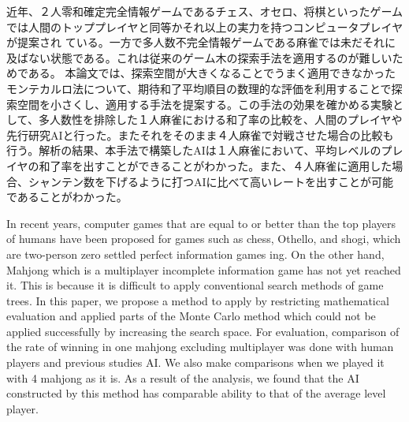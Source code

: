 
\begin{jabstract}

近年、２人零和確定完全情報ゲームであるチェス、オセロ、将棋といったゲームでは人間のトッププレイヤと同等かそれ以上の実力を持つコンピュータプレイヤが提案され
ている。一方で多人数不完全情報ゲームである麻雀では未だそれに及ばない状態である。これは従来のゲーム木の探索手法を適用するのが難しいためである。
本論文では、探索空間が大きくなることでうまく適用できなかったモンテカルロ法について、期待和了平均順目の数理的な評価を利用することで探索空間を小さくし、適用する手法を提案する。この手法の効果を確かめる実験として、多人数性を排除した１人麻雀における和了率の比較を、人間のプレイヤや先行研究AIと行った。またそれをそのまま４人麻雀で対戦させた場合の比較も行う。解析の結果、本手法で構築したAIは１人麻雀において、平均レベルのプレイヤの和了率を出すことができることがわかった。また、４人麻雀に適用した場合、シャンテン数を下げるように打つAIに比べて高いレートを出すことが可能であることがわかった。


\end{jabstract}


\begin{eabstract}

In recent years, computer games that are equal to or better than the top players of humans have been proposed for games such as chess, Othello, and shogi, which are two-person zero settled perfect information games
ing. On the other hand, Mahjong which is a multiplayer incomplete information game has not yet reached it. This is because it is difficult to apply conventional search methods of game trees.
In this paper, we propose a method to apply by restricting mathematical evaluation and applied parts of the Monte Carlo method which could not be applied successfully by increasing the search space.
For evaluation, comparison of the rate of winning in one mahjong excluding multiplayer was done with human players and previous studies AI. We also make comparisons when we played it with 4 mahjong as it is.
As a result of the analysis, we found that the AI ​​constructed by this method has comparable ability to that of the average level player.

\end{eabstract}
